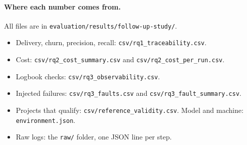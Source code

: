 \documentclass[10pt,a4paper]{article}
\newcommand{\file}[1]{\texttt{#1}}
\begin{document}
\paragraph{Where each number comes from.} All files are in \file{evaluation/results/follow-up-study/}.
\begin{itemize}[leftmargin=*,itemsep=1pt]
\item Delivery, churn, precision, recall: \file{csv/rq1\_traceability.csv}.
\item Cost: \file{csv/rq2\_cost\_summary.csv} and \file{csv/rq2\_cost\_per\_run.csv}.
\item Logbook checks: \file{csv/rq3\_observability.csv}.
\item Injected failures: \file{csv/rq3\_faults.csv} and \file{csv/rq3\_fault\_summary.csv}.
\item Projects that qualify: \file{csv/reference\_validity.csv}. Model and machine: \file{environment.json}.
\item Raw logs: the \file{raw/} folder, one JSON line per step.
\end{itemize}
\end{document}
